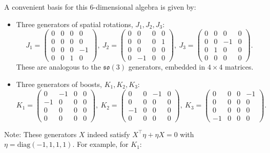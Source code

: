 \documentclass{amsart}
\theoremstyle{definition}
\theoremstyle{remark}
\begin{document}
A convenient basis for this 6-dimensional algebra is given by:
\begin{itemize}
    \item Three generators of spatial rotations, $J_1, J_2, J_3$:
    \begin{equation*} J_1 = \begin{pmatrix} 0&0&0&0 \\ 0&0&0&0 \\ 0&0&0&-1 \\ 0&0&1&0 \end{pmatrix}, \
       J_2 = \begin{pmatrix} 0&0&0&0 \\ 0&0&0&1 \\ 0&0&0&0 \\ 0&-1&0&0 \end{pmatrix}, \
       J_3 = \begin{pmatrix} 0&0&0&0 \\ 0&0&-1&0 \\ 0&1&0&0 \\ 0&0&0&0 \end{pmatrix}.
    \end{equation*}
    These are analogous to the $\mathfrak{so}(3)$ generators, embedded in $4 \times 4$ matrices.
    \item Three generators of boosts, $K_1, K_2, K_3$:
    \begin{equation*} K_1 = \begin{pmatrix} 0&-1&0&0 \\ -1&0&0&0 \\ 0&0&0&0 \\ 0&0&0&0 \end{pmatrix}, \
       K_2 = \begin{pmatrix} 0&0&-1&0 \\ 0&0&0&0 \\ -1&0&0&0 \\ 0&0&0&0 \end{pmatrix}, \
       K_3 = \begin{pmatrix} 0&0&0&-1 \\ 0&0&0&0 \\ 0&0&0&0 \\ -1&0&0&0 \end{pmatrix}.
    \end{equation*}
\end{itemize}
Note: These generators $X$ indeed satisfy $X^\top \eta + \eta X = 0$ with $\eta=\mathrm{diag}(-1,1,1,1)$. For example, for $K_1$:
\end{document}
